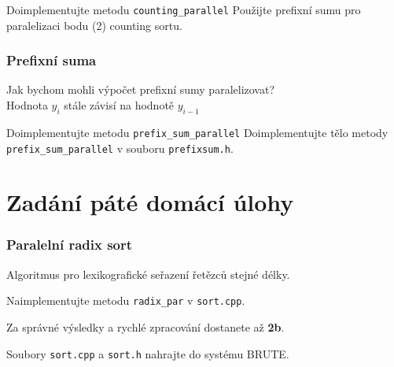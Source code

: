 \documentclass[usenames,dvipsnames,9pt]{beamer}
\begin{document}
{\begin{frame}
\end{frame}

{
\begin{frame}
	\begin{block}{Doimplementujte metodu \texttt{counting\_parallel}}
	    Použijte prefixní sumu pro paralelizaci bodu (2) counting sortu.
    \end{block}
\end{frame}}

{
\begin{frame}
\frametitle{Prefixní suma}

	\begin{center}
		\Large Jak bychom mohli výpočet prefixní sumy paralelizovat? \\
		\large Hodnota $y_i$ stále závisí na hodnotě $y_{i-1}$
	\end{center}

  \begin{block}{Doimplementujte metodu \texttt{prefix\_sum\_parallel}}
    Doimplementujte tělo metody \texttt{prefix\_sum\_parallel} v souboru \texttt{prefixsum.h}.
  \end{block}
\end{frame}
}
}


 \section{Zadání páté domácí úlohy}
 
%
%
%
 
 

 \begin{frame}
   \frametitle{Paralelní radix sort}
   
   Algoritmus pro lexikografické seřazení řetězců stejné délky.
   
      \vspace{1.5em}
   
   Naimplementujte metodu \texttt{radix\_par} v \texttt{sort.cpp}.%
  
  
   \vspace{1.5em}
  
   Za správné výsledky a rychlé zpracování dostanete až {\bf 2b}.
  
    \vspace{1.5em}
    
   

 Soubory \texttt{sort.cpp} a \texttt{sort.h}  nahrajte do systému BRUTE.
  

 \end{frame}


\framefeedback{}
\end{document}
